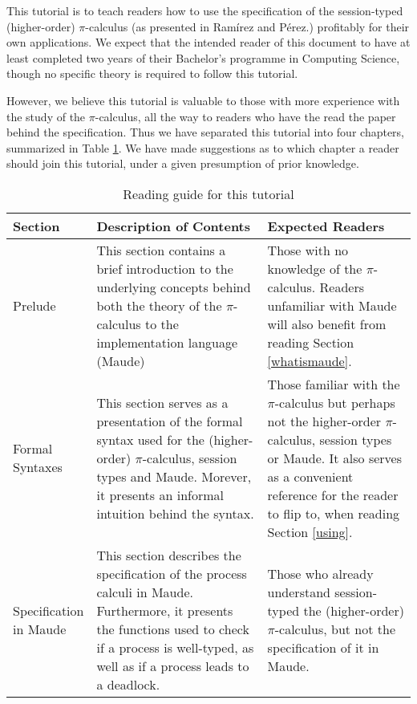 This tutorial is to teach readers how to use the specification of the session-typed (higher-order) $\pi$-calculus (as presented in Ramírez and Pérez.\cite{main}) profitably for their own applications. We expect that the intended reader of this document to have at least completed two years of their Bachelor's programme in Computing Science, though no specific theory is required to follow this tutorial.

However, we believe this tutorial is valuable to those with more experience with the study of the $\pi$-calculus, all the way to readers who have the read the paper behind the specification. Thus we have separated this tutorial into four chapters, summarized in Table \ref{suggestedreading}. We have made suggestions as to which chapter a reader should join this tutorial, under a given presumption of prior knowledge.

\begin{table}[H]
\centering
\bgroup
\def\arraystretch{1.5}
\begin{tabular}{|>{\raggedright}m{0.16\linewidth} | m{0.45\linewidth} | m{0.4\linewidth}|}
\hline
\textbf{Section} & \textbf{Description of Contents} & \textbf{Expected Readers} \\ \hline

Prelude & This section contains a brief introduction to the underlying concepts behind both the theory of the $\pi$-calculus to the implementation language (Maude) & Those with no knowledge of the $\pi$-calculus. Readers unfamiliar with Maude will also benefit from reading Section \ref{whatismaude}.\\ \hline
Formal Syntaxes & This section serves as a presentation of the formal syntax used for the (higher-order) $\pi$-calculus, session types and Maude. Morever, it presents an informal intuition behind the syntax. & Those familiar with the $\pi$-calculus but perhaps not the higher-order $\pi$-calculus, session types or Maude. It also serves as a convenient reference for the reader to flip to, when reading Section \ref{using}.\\ \hline
Specification in Maude & This section describes the specification of the process calculi in Maude. Furthermore, it presents the functions used to check if a process is well-typed, as well as if a process leads to a deadlock. & Those who already understand session-typed the (higher-order) $\pi$-calculus, but not the specification of it in Maude. \\ \hline
\end{tabular}
\egroup
\caption{\label{suggestedreading} Reading guide for this tutorial}
\end{table}

